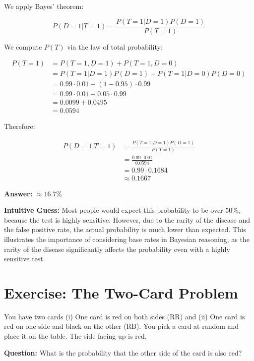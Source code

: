 \documentclass[11pt]{article}
\begin{document}
We apply Bayes’ theorem:

\[
P(D = 1 | T = 1) = \frac{P(T = 1 | D = 1) P(D = 1)}{P(T = 1)}
\]

We compute $P(T)$ via the law of total probability:

\begin{align*}
  P(T = 1) &= P(T = 1, D = 1) + P(T = 1, D = 0) \\
           &= P(T = 1 | D = 1) P(D = 1) + P(T = 1 | D = 0) P(D = 0) \\
           &= 0.99 \cdot 0.01 + (1 - 0.95) \cdot 0.99 \\
           &= 0.99 \cdot 0.01 + 0.05 \cdot 0.99 \\
           &= 0.0099 + 0.0495 \\
           &= 0.0594
\end{align*}

Therefore:

\begin{align*}
  P(D = 1 | T = 1) &= \frac{P(T = 1 | D = 1) P(D = 1)}{P(T = 1)} \\
                   &= \frac{0.99 \cdot 0.01}{0.0594} \\
                   &= 0.99 \cdot 0.1684 \\
                   &\approx 0.1667
\end{align*}

\noindent
\textbf{Answer:} $\boxed{\approx 16.7\%}$

\noindent
\textbf{Intuitive Guess:} Most people would expect this probability to be over $50\%$, because the test is highly sensitive. However, due to the rarity of the disease and the false positive rate, the actual probability is much lower than expected.
This illustrates the importance of considering base rates in Bayesian reasoning, as the rarity of the disease significantly affects the probability even with a highly sensitive test.
\fi

\vspace{1cm}

\section{Exercise: The Two-Card Problem}

You have two cards (i) One card is red on both sides (RR) and (ii) One card is red on one side and black on the other (RB).
You pick a card at random and place it on the table. The side facing up is red.

\noindent
\textbf{Question:} What is the probability that the other side of the card is also red?
\end{document}
